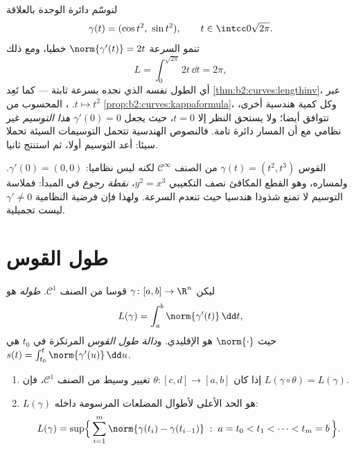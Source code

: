 \begin{example}\label{ex:b2:curves:speedinvariance}
لنوسّم دائرة الوحدة بالعلاقة
\[
\gamma(t) = (\cos t^2,\ \sin t^2),
\qquad t \in \intcc0{\sqrt{2\pi}} .
\]
تنمو السرعة $\norm{\gamma'(t)} = 2t$ خطيا، ومع ذلك
\[
L = \int_0^{\sqrt{2\pi}}2t\,\dd t = 2\pi ,
\]
أي الطول نفسه الذي نجده بسرعة ثابتة --- كما تَعِد \cref{thm:b2:curves:lengthinv}، عبر  $t \mapsto t^2$. ،  المحسوب من \cref{prop:b2:curves:kappaformula}، وكل كمية هندسية
أخرى، تتوافق أيضا؛ ولا يستحق النظر إلا $t = 0$، حيث يجعل $\gamma'(0) = 0$
\emph{هذا التوسيم} غير نظامي مع أن المسار دائرة تامة. فالنصوص
الهندسية تتحمل التوسيمات السيئة تحملا سيئا: أعد التوسيم أولا، ثم
استنتج ثانيا.
\end{example}

\begin{example}\label{ex:b2:curves:cusp}
القوس $\gamma(t) = (t^2, t^3)$ من الصنف $\mathcal{C}^\infty$ لكنه ليس نظاميا: $\gamma'(0) = (0, 0)$. ولمساره، وهو
القطع المكافئ نصف التكعيبي $y^2 = x^3$، \emph{نقطة رجوع} في المبدأ:
فملاسة التوسيم لا تمنع شذوذا هندسيا حيث تنعدم السرعة. ولهذا فإن
فرضية النظامية $\gamma' \neq 0$ ليست تجميلية.
\end{example}

\section{طول القوس}

\begin{definition}\label{def:b2:curves:length}
ليكن $\gamma \colon [a, b] \to \R^n$ قوسا من الصنف $\mathcal{C}^1$. \emph{طوله} هو
\[
L(\gamma) = \int_a^b \norm{\gamma'(t)}\, \dd t ,
\]
حيث $\norm{\cdot}$ هو  الإقليدي. و\emph{دالة طول القوس}
المرتكزة في $t_0$ هي $s(t) = \int_{t_0}^t
\norm{\gamma'(u)}\,\dd u$.
\end{definition}

\begin{theorem}\label{thm:b2:curves:lengthinv}
\leavevmode
\begin{enumerate}
\item إذا كان $\theta \colon [c, d] \to [a, b]$ تغيير وسيط من الصنف $\mathcal{C}^1$، فإن $L(\gamma \circ \theta) = L(\gamma)$.
\item $L(\gamma)$ هو الحد الأعلى لأطوال المضلعات المرسومة داخله:
\[
L(\gamma)
= \sup\Bigl\{\, \sum_{i=1}^{m} \norm{\gamma(t_i) -
\gamma(t_{i-1})} \;:\; a = t_0 < t_1 < \dots < t_m = b \,\Bigr\}.
\]
\end{enumerate}
\end{theorem}

